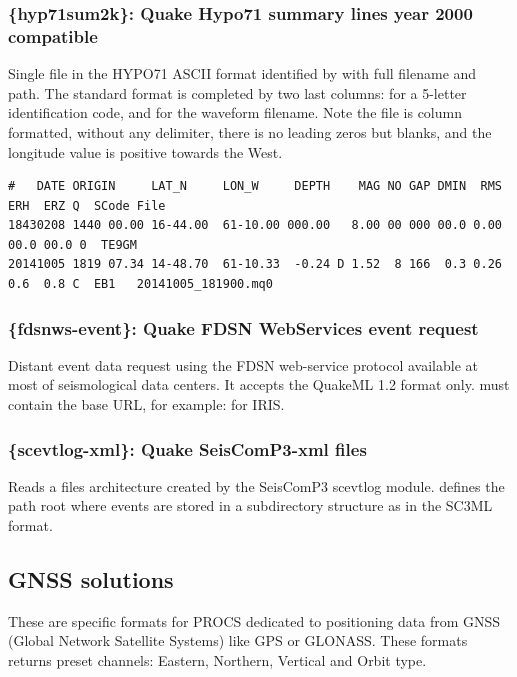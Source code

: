 \subsubsection{\{hyp71sum2k\}: Quake Hypo71 summary lines year 2000 compatible}

Single file in the HYPO71 ASCII format identified by  with full filename and path. The standard format is completed by two last columns:  for a 5-letter identification code, and  for the waveform filename. Note the file is column formatted, without any delimiter, there is no leading zeros but blanks, and the longitude value is positive towards the West.

\begin{lstlisting}[title=HYPO71 format example]
#   DATE ORIGIN     LAT_N     LON_W     DEPTH    MAG NO GAP DMIN  RMS  ERH  ERZ Q  SCode File
18430208 1440 00.00 16-44.00  61-10.00 000.00   8.00 00 000 00.0 0.00 00.0 00.0 0  TE9GM
20141005 1819 07.34 14-48.70  61-10.33  -0.24 D 1.52  8 166  0.3 0.26  0.6  0.8 C  EB1   20141005_181900.mq0
\end{lstlisting}


\subsubsection{\{fdsnws-event\}: Quake FDSN WebServices event request}

Distant event data request using the FDSN web-service protocol available at most of seismological data centers. It accepts the QuakeML 1.2 format only.  must contain the base URL, for example:  for IRIS.


\subsubsection{\{scevtlog-xml\}: Quake SeisComP3-xml files}

Reads a files architecture created by the SeisComP3 scevtlog module.  defines the path root where events are stored in a subdirectory structure as  in the SC3ML format.


\subsection{GNSS solutions}
\label{gnssformats}
These are specific formats for PROCS dedicated to positioning data from GNSS (Global Network Satellite Systems) like GPS or GLONASS. These formats returns preset channels: Eastern, Northern, Vertical and Orbit type.


